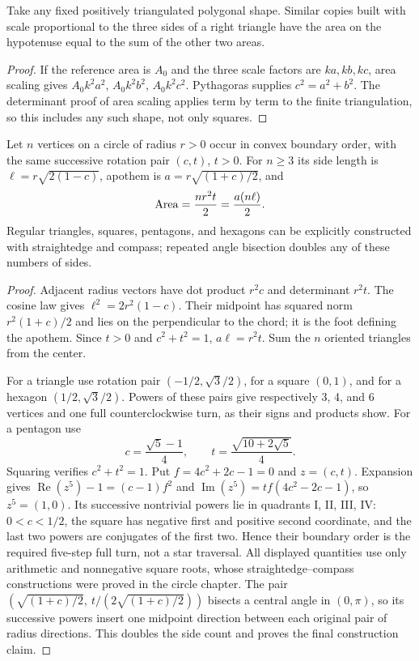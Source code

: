 \begin{theorem}
\label{poly:similar-pythagoras}
Take any fixed positively triangulated polygonal shape. Similar copies
built with scale proportional to the three sides of a right triangle
have the area on the hypotenuse equal to the sum of the other two areas.
\end{theorem}
\begin{proof}
If the reference area is $A_0$ and the three scale factors are
$ka,kb,kc$, area scaling gives $A_0k^2a^2$, $A_0k^2b^2$,
$A_0k^2c^2$. Pythagoras supplies $c^2=a^2+b^2$.
The determinant proof of area scaling applies term by term to the finite
triangulation, so this includes any such shape, not only squares.
\end{proof}

\begin{theorem}
\label{poly:regular}
Let $n$ vertices on a circle of radius $r>0$ occur in convex boundary
order, with the same successive rotation pair $(c,t)$, $t>0$.
For $n\ge3$ its side length is $\ell=r\sqrt{2(1-c)}$, apothem is
$a=r\sqrt{(1+c)/2}$, and
\[
 \operatorname{Area}=\frac{nr^2t}{2}=\frac{a(n\ell)}2.
\]
Regular triangles, squares, pentagons, and hexagons can be explicitly
constructed with straightedge and compass; repeated angle bisection
doubles any of these numbers of sides.
\end{theorem}
\begin{proof}
Adjacent radius vectors have dot product $r^2c$ and determinant $r^2t$.
The cosine law gives $\ell^2=2r^2(1-c)$. Their midpoint has squared
norm $r^2(1+c)/2$ and lies on the perpendicular to the chord; it is
the foot defining the apothem. Since $t>0$ and $c^2+t^2=1$,
$a\ell=r^2t$. Sum the $n$ oriented triangles from the center.

For a triangle use rotation pair $(-1/2,\sqrt3/2)$, for a square
$(0,1)$, and for a hexagon $(1/2,\sqrt3/2)$. Powers of these pairs
give respectively 3, 4, and 6 vertices and one full counterclockwise turn,
as their signs and products show. For a pentagon use
\[
 c=\frac{\sqrt5-1}{4},\qquad
 t=\frac{\sqrt{10+2\sqrt5}}4.
\]
Squaring verifies $c^2+t^2=1$. Put $f=4c^2+2c-1=0$ and $z=(c,t)$.
Expansion gives $\operatorname{Re}(z^5)-1=(c-1)f^2$ and
$\operatorname{Im}(z^5)=tf(4c^2-2c-1)$, so $z^5=(1,0)$.
Its successive nontrivial powers lie in quadrants
I, II, III, IV: $0<c<1/2$, the square has negative first and positive
second coordinate, and the last two powers are conjugates of the first
two. Hence their boundary order is the required five-step full turn,
not a star traversal. All displayed quantities use only arithmetic and
nonnegative square roots, whose straightedge--compass constructions were
proved in the circle chapter. The pair
$(\sqrt{(1+c)/2},\ t/(2\sqrt{(1+c)/2}))$ bisects a central angle
in $(0,\pi)$, so its successive powers insert one midpoint direction
between each original pair of radius directions. This doubles the side
count and proves the final construction claim.
\end{proof}
